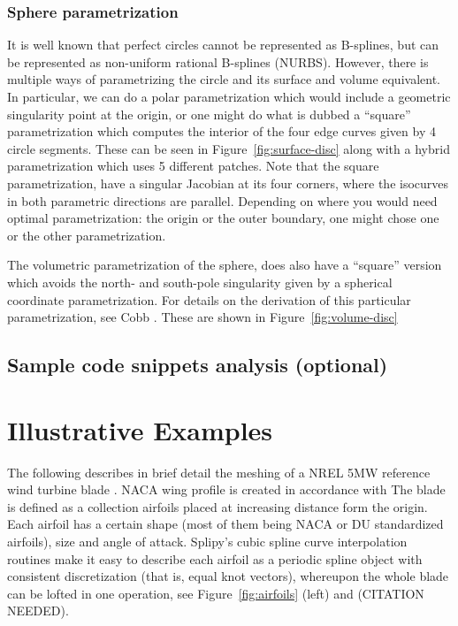 \documentclass[preprint,12pt, a4paper]{elsarticle}
\begin{document}
\subsubsection{Sphere parametrization}
\label{sec:sphere}
It is well known that perfect circles cannot be represented as B-splines, but can be represented as non-uniform rational B-splines (NURBS).
However, there is multiple ways of parametrizing the circle and its surface and volume equivalent.
In particular, we can do a polar parametrization which would include a geometric singularity point at the origin, or one might do what is dubbed a ``square'' parametrization which computes the interior of the four edge curves given by 4 circle segments.
These can be seen in Figure~\ref{fig:surface-disc} along with a hybrid parametrization which uses 5 different patches.
Note that the square parametrization, have a singular Jacobian at its four corners, where the isocurves in both parametric directions are parallel.
Depending on where you would need optimal parametrization: the origin or the outer boundary, one might chose one or the other parametrization.

The volumetric parametrization of the sphere, does also have a ``square'' version which avoids the north- and south-pole singularity given by a spherical coordinate parametrization.
For details on the derivation of this particular parametrization, see Cobb \cite{cobb1988tts}.
These are shown in Figure~\ref{fig:volume-disc}

\subsection{Sample code snippets analysis (optional)}
\label{}

\section{Illustrative Examples}
\label{sec:naca}

The following describes in brief detail the meshing of a NREL 5MW reference wind turbine blade \cite{Jonkman2009drw}.
NACA wing profile is created in accordance with \cite{abbott1959tow}
The blade is defined as a collection airfoils placed at increasing distance form the origin.
Each airfoil has a certain shape (most of them being NACA or DU standardized airfoils), size and angle of attack.
Splipy's cubic spline curve interpolation routines make it easy to describe each airfoil as a periodic spline object with consistent discretization (that is, equal knot vectors), whereupon the whole blade can be lofted in one operation, see Figure~\ref{fig:airfoils} (left) and (CITATION NEEDED).
\end{document}
